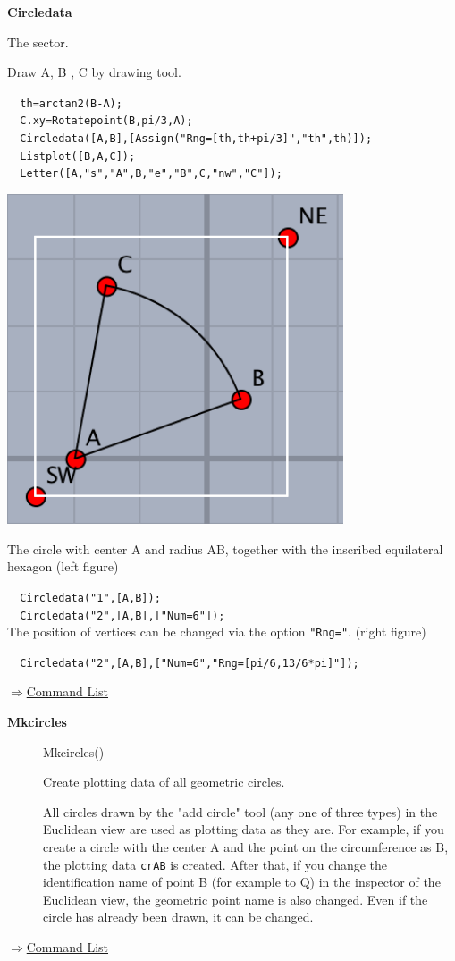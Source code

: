 \documentclass[papersize,a4paper,12pt]{article}
\newenvironment{cmd}[2]{
\hypertarget{#2}{}
\begin{center}{\bf\large #1}\end{center}
\begin{description}
}{
\end{description}
\begin{flushright} \hyperlink{functionlist}{$\Rightarrow$Command List}\end{flushright}
}
\newcommand{\itemket}[1]{
\item[\Ltab{27mm}{#1}]
}
\begin{document}
\begin{cmd}{Circledata}{circledata}
The sector.

Draw A, B , C by drawing tool.

\verb|  th=arctan2(B-A);| \\
\verb|  C.xy=Rotatepoint(B,pi/3,A);|\\
\verb|  Circledata([A,B],[Assign("Rng=[th,th+pi/3]","th",th)]);|\\
\verb|  Listplot([B,A,C]);|\\
\verb|  Letter([A,"s","A",B,"e","B",C,"nw","C"]);|

\begin{center}
\includegraphics[bb=0.00 0.00 180.01 177.01,width=4cm"] {Fig/circledata3.pdf}\hspace{12mm}  
\end{center}

The circle with center A and radius AB, together with the inscribed equilateral hexagon (left figure)

\verb|  Circledata("1",[A,B]);|\\
\verb|  Circledata("2",[A,B],["Num=6"]);|\\ 

The position of vertices can be changed via the option \verb|"Rng="|. (right figure)

\verb|  Circledata("2",[A,B],["Num=6","Rng=[pi/6,13/6*pi]"]);|

\begin{center}
 \hspace{20mm}
\end{center}

\end{cmd}

\begin{cmd}{Mkcircles}{mkcircles}
\itemket{Usage}Mkcircles()
\itemket{Description}Create plotting data of all geometric circles. 
\itemket{Details}
All circles drawn by the "add circle" tool (any one of three types) in the Euclidean view are used as plotting data as they are. 
For example, if you create a circle with the center A and the point on the circumference as B, the plotting data \verb|crAB| is created. 
After that, if you change the identification name of point B (for example to Q) in the inspector of the Euclidean view, the geometric point name is also changed. 
Even if the circle has already been drawn, it can be changed. \\
\end{cmd}
\end{document}

